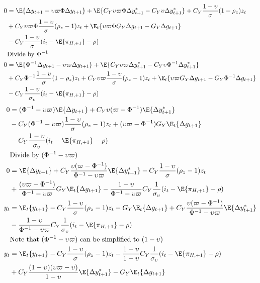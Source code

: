 \begin{align}
    0  &= \E \{ \Delta y_{t+1} -\upsilon \varpi \Phi \Delta y_{t+1}\} + \E \{C_Y \upsilon \varpi \Phi \Delta y^*_{t+1} - C_Y \upsilon \Delta y_{t+1}^* \} + C_Y\frac{1-\upsilon}{\sigma}(1-\rho_z)z_t \nonumber \\ 
    &+ C_Y \upsilon \varpi \Phi \frac{1-\upsilon}{\sigma} (\rho_z - 1)z_t + \E_t\{\upsilon \varpi\Phi G_Y \Delta g_{t+1} -G_Y \Delta g_{t+1}\} \nonumber \\ 
    &- C_Y\frac{1-\upsilon}{\sigma}(i_t - \E \{ \pi_{H,+1}\} - \rho)\\
    &\text{Divide by $\Phi^{-1}$}\nonumber\\
    0  &=  \E \{ \Phi^{-1} \Delta y_{t+1} - \upsilon \varpi \Delta y_{t+1}\} + \E \{C_Y \upsilon \varpi \Delta y^*_{t+1} - C_Y\upsilon \Phi^{-1} \Delta y_{t+1}^* \} \nonumber\\
        &  +C_Y \Phi^{-1} \frac{1-\upsilon}{\sigma}(1-\rho_z)z_t + C_Y\upsilon \varpi \frac{1-\upsilon}{\sigma} (\rho_z - 1)z_t + \E_t\{\upsilon \varpi G_Y \Delta g_{t+1} -G_Y \Phi^{-1}\Delta g_{t+1}\}\nonumber\\
        &- C_Y \frac{1-\upsilon}{\sigma_\upsilon}(i_t - \E \{ \pi_{H,+1}\} - \rho)
\end{align}
\begin{align}   
    0  &= (\Phi^{-1} - \upsilon \varpi) \E \{ \Delta y_{t+1}\} +C_Y \upsilon ( \varpi - \Phi^{-1})\E \{\Delta y_{t+1}^* \} \nonumber\\
        &  -C_Y(\Phi^{-1} -\upsilon \varpi)\frac{1-\upsilon}{\sigma} (\rho_z - 1)z_t + (\upsilon \varpi  - \Phi^{-1}) G_Y \E_t\{\Delta g_{t+1}\}\nonumber\\
        &- C_Y\frac{1-\upsilon}{\sigma_\upsilon}(i_t - \E \{ \pi_{H,+1}\} - \rho)\\
    &\text{Divide by $(\Phi^{-1} - \upsilon \varpi)$}\\
    0  &= \E \{ \Delta y_{t+1}\} + C_Y\frac{\upsilon (\varpi - \Phi^{-1})}{\Phi^{-1} -\upsilon \varpi}\E \{\Delta y_{t+1}^* \} -C_Y\frac{1-\upsilon}{\sigma} (\rho_z - 1)z_t  \nonumber\\
        &+ \frac{(\upsilon \varpi  - \Phi^{-1})}{\Phi^{-1} -\upsilon \varpi} G_Y \E_t\{\Delta g_{t+1}\}- \frac{1-\upsilon}{\Phi^{-1} -\upsilon \varpi}C_Y\frac{1}{\sigma_\upsilon}(i_t - \E \{ \pi_{H,+1}\} - \rho)\\
    y_t  &= \E_t\{y_{t+1}\}  - C_Y \frac{1-\upsilon}{\sigma} (\rho_z - 1)z_t - G_Y \E_t\{\Delta g_{t+1}\} + C_Y\frac{\upsilon ( \varpi - \Phi^{-1})}{\Phi^{-1} -\upsilon \varpi}\E \{\Delta y_{t+1}^* \} \nonumber \\ 
    &- \frac{1-\upsilon}{\Phi^{-1} -\upsilon \varpi}C_Y \frac{1}{\sigma_\upsilon}(i_t - \E \{ \pi_{H,+1}\} - \rho) \\
    &\text{Note that $(\Phi^{-1} -\upsilon \varpi)$ can be simplified to $(1-\upsilon)$ }\\
    y_t  &= \E_t\{y_{t+1}\}  -C_Y \frac{1-\upsilon}{\sigma} (\rho_z - 1)z_t - \frac{1-\upsilon}{1-\upsilon} C_Y \frac{1}{\sigma_\upsilon}(i_t - \E \{ \pi_{H,+1}\} - \rho) \nonumber \\ 
    &+ C_Y\frac{(1-\upsilon)(\upsilon \varpi - \upsilon)}{1 - \upsilon}\E \{\Delta y_{t+1}^* \} - G_Y \E_t\{\Delta g_{t+1}\}
\end{align}
